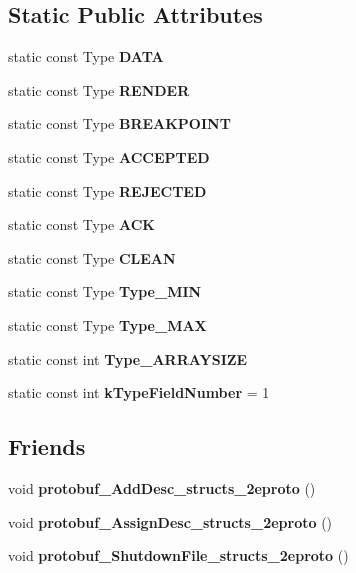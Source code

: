 \subsection*{Static Public Attributes}
\begin{DoxyCompactItemize}
\item 
static const Type {\bfseries D\+A\+TA}
\item 
static const Type {\bfseries R\+E\+N\+D\+ER}
\item 
static const Type {\bfseries B\+R\+E\+A\+K\+P\+O\+I\+NT}
\item 
static const Type {\bfseries A\+C\+C\+E\+P\+T\+ED}
\item 
static const Type {\bfseries R\+E\+J\+E\+C\+T\+ED}
\item 
static const Type {\bfseries A\+CK}
\item 
static const Type {\bfseries C\+L\+E\+AN}
\item 
static const Type {\bfseries Type\+\_\+\+M\+IN}
\item 
static const Type {\bfseries Type\+\_\+\+M\+AX}
\item 
static const int {\bfseries Type\+\_\+\+A\+R\+R\+A\+Y\+S\+I\+ZE}
\item 
\hypertarget{classstruct_definitions_1_1_message_info_a3cb84809d173ea49e58dea61b00a820d}{}\label{classstruct_definitions_1_1_message_info_a3cb84809d173ea49e58dea61b00a820d} 
static const int {\bfseries k\+Type\+Field\+Number} = 1
\end{DoxyCompactItemize}
\subsection*{Friends}
\begin{DoxyCompactItemize}
\item 
\hypertarget{classstruct_definitions_1_1_message_info_abcf9b7cc173b6d79696d01156751b8ce}{}\label{classstruct_definitions_1_1_message_info_abcf9b7cc173b6d79696d01156751b8ce} 
void {\bfseries protobuf\+\_\+\+Add\+Desc\+\_\+structs\+\_\+2eproto} ()
\item 
\hypertarget{classstruct_definitions_1_1_message_info_adb32752ff5178cb902966da6e3cb3bc6}{}\label{classstruct_definitions_1_1_message_info_adb32752ff5178cb902966da6e3cb3bc6} 
void {\bfseries protobuf\+\_\+\+Assign\+Desc\+\_\+structs\+\_\+2eproto} ()
\item 
\hypertarget{classstruct_definitions_1_1_message_info_ac2e4278d7604361fa6502b1cfbf9d980}{}\label{classstruct_definitions_1_1_message_info_ac2e4278d7604361fa6502b1cfbf9d980} 
void {\bfseries protobuf\+\_\+\+Shutdown\+File\+\_\+structs\+\_\+2eproto} ()
\end{DoxyCompactItemize}



